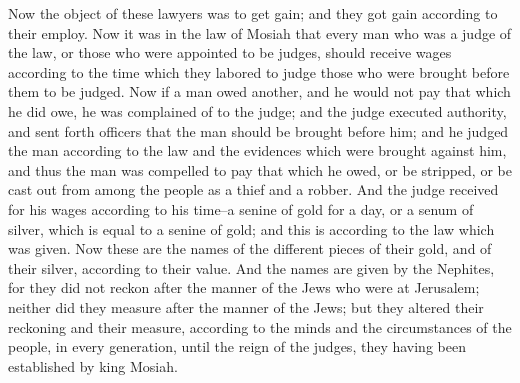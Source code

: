 Now the object of these lawyers was to get gain; and they got gain according to their employ.
\bchapter
\bverse \iffalse Now it was in the law of Mosiah that every man who was a judge of the law, or those who were appointed to be judges, should receive wages according to the time which they labored to judge those who were brought before them to be judged. \fi
Now it was in the law of Mosiah that every man who was a judge of the law, or those who were appointed to be judges, should receive wages according to the time which they labored to judge those who were brought before them to be judged.
\bverse \iffalse Now if a man owed another, and he would not pay that which he did owe, he was complained of to the judge; and the judge executed authority, and sent forth officers that the man should be brought before him; and he judged the man according to the law and the evidences which were brought against him, and thus the man was compelled to pay that which he owed, or be stripped, or be cast out from among the people as a thief and a robber. \fi
Now if a man owed another, and he would not pay that which he did owe, he was complained of to the judge; and the judge executed authority, and sent forth officers that the man should be brought before him; and he judged the man according to the law and the evidences which were brought against him, and thus the man was compelled to pay that which he owed, or be stripped, or be cast out from among the people as a thief and a robber.
\bverse \iffalse And the judge received for his wages according to his time--a senine of gold for a day, or a senum of silver, which is equal to a senine of gold; and this is according to the law which was given. \fi
And the judge received for his wages according to his time--a senine of gold for a day, or a senum of silver, which is equal to a senine of gold; and this is according to the law which was given.
\bverse \iffalse Now these are the names of the different pieces of their gold, and of their silver, according to their value. And the names are given by the Nephites, for they did not reckon after the manner of the Jews who were at Jerusalem; neither did they measure after the manner of the Jews; but they altered their reckoning and their measure, according to the minds and the circumstances of the people, in every generation, until the reign of the judges, they having been established by king Mosiah. \fi
Now these are the names of the different pieces of their gold, and of their silver, according to their value. And the names are given by the Nephites, for they did not reckon after the manner of the Jews who were at Jerusalem; neither did they measure after the manner of the Jews; but they altered their reckoning and their measure, according to the minds and the circumstances of the people, in every generation, until the reign of the judges, they having been established by king Mosiah.
